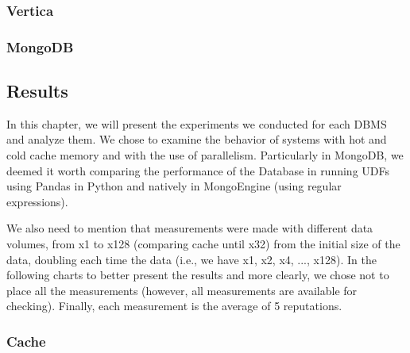\subsubsection{Vertica}
\subsubsection{MongoDB}


\subsection{Results}

In this chapter, we will present the experiments we conducted for each DBMS and analyze them. 
We chose to examine the behavior of systems with hot and cold cache memory and with the use of parallelism. 
Particularly in MongoDB, we deemed it worth comparing the performance of the Database in running UDFs using 
Pandas in Python and natively in MongoEngine (using regular expressions).

We also need to mention that measurements were made with different data volumes, 
from x1 to x128 (comparing cache until x32) from the initial size of the data, doubling each time the data (i.e., we have x1, x2, x4, ..., x128). 
In the following charts to better present the results and more clearly, we chose not to place all the measurements 
(however, all measurements are available for checking). Finally, each measurement is the average of 5 reputations.

\subsubsection{Cache}

